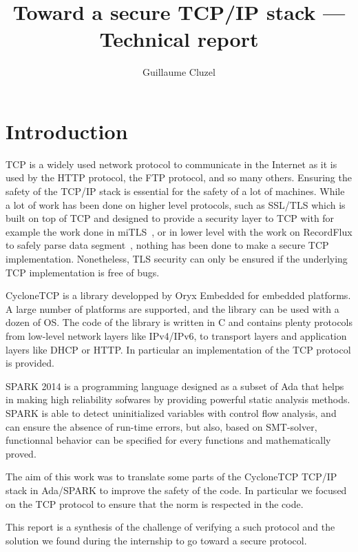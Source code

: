 \documentclass[a4paper, 10pt]{article}
\author{Guillaume Cluzel}
\title{Toward a secure TCP/IP stack --- Technical report}
\begin{document}
    \maketitle

    \tableofcontents

    \section{Introduction}

    TCP is a widely used network protocol to communicate in the Internet as
    it is used by the HTTP protocol, the FTP protocol, and so many others.
    Ensuring the safety of the TCP/IP stack is essential for the safety of
    a lot of machines. While a lot of work has been done on higher level
    protocols, such as SSL/TLS which is built on top of TCP and designed
    to provide a security layer to TCP with for example the work done in
    miTLS~\cite{bhargavan2013implementing}, or in lower level with the work
    on RecordFlux to safely parse data segment~\cite{Reiher_2020}, nothing has
    been done to make a secure TCP implementation. Nonetheless, TLS security
    can only be ensured if the underlying TCP implementation is free of bugs.

    CycloneTCP is a library developped by Oryx Embedded for embedded platforms.
    A large number of platforms are supported, and the library can be used
    with a dozen of OS. The code of the library is written in C and contains
    plenty protocols from low-level network layers like IPv4/IPv6, to transport layers
    and application layers like DHCP or HTTP. In particular an implementation of
    the TCP protocol is provided.

    SPARK 2014 is a programming language designed as a subset of Ada that helps in
    making high reliability sofwares by providing powerful static analysis methods.
    SPARK is able to detect uninitialized variables with control flow analysis,
    and can ensure the absence of run-time errors,
    but also, based on SMT-solver, functionnal behavior can be specified for every
    functions and mathematically proved.

    The aim of this work was to translate some parts of the CycloneTCP TCP/IP stack
    in Ada/SPARK to improve the safety of the code. In particular we focused
    on the TCP protocol to ensure that the norm is respected in the code.

    This report is a synthesis of the challenge of verifying a such protocol
    and the solution we found during the internship to go toward a secure protocol.
\end{document}
